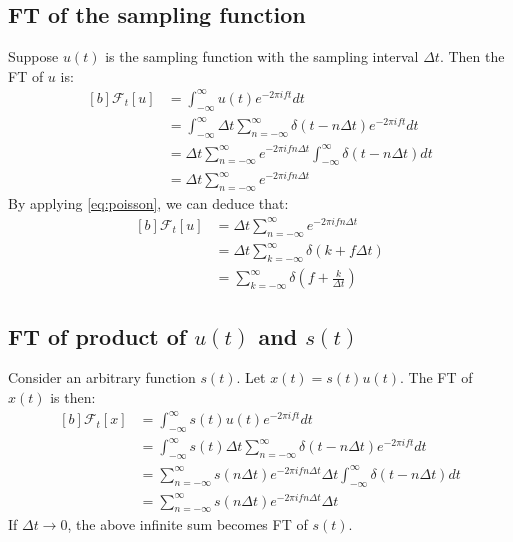 \documentclass[letterpaper, 11pt]{article}
\newcommand{\fint}{\int_{-\infty}^{\infty}} %
\newcommand{\fsum}[1]{\sum_{#1 = -\infty}^{\infty}} %
\newcommand{\spf}[2]{\Delta #1 \fsum{#2} \delta (#1 - #2 \Delta #1)} %
\newcommand{\fourier}[2]{\mathcal{F}_{#1}[#2]} %
\newcommand{\ft}[3]{\fint #2 e^{-2\pi i#3#1} d#1} %
\numberwithin{equation}{section}
\numberwithin{figure}{section}
\numberwithin{table}{section}
\begin{document}
\subsection{FT of the sampling function}
Suppose \(u(t)\) is the sampling function with the sampling interval \(\Delta t\). Then the FT of \(u\) is:
\begin{equation}
	\begin{aligned}[b]
		\fourier{t}{u}
			&= \ft{t}{u(t)}{f} \\
			&= \ft{t}{\spf{t}{n}}{f} \\
			&= \Delta t \fsum{n} e^{-2\pi ifn\Delta t} \fint \delta (t - n \Delta t) dt \\
			&= \Delta t \fsum{n} e^{-2\pi ifn\Delta t}
	\end{aligned}
\end{equation}
By applying \eqref{eq:poisson}, we can deduce that:
\begin{equation}
	\begin{aligned}[b]
		\fourier{t}{u}
			&= \Delta t \fsum{n} e^{-2\pi ifn\Delta t} \\
			&= \Delta t \fsum{k} \delta (k + f \Delta t)\\
			&= \fsum{k} \delta (f + \frac{k}{\Delta t})
	\end{aligned}
\end{equation}

\subsection{FT of product of \(u(t)\) and \(s(t)\)}\label{sec:su}
Consider an arbitrary function \(s(t)\). Let \(x(t) = s(t)u(t)\). The FT of \(x(t)\) is then:
\begin{equation}
	\begin{aligned}[b]
		\fourier{t}{x}
			&= \ft{t}{s(t)u(t)}{f}\\
			&= \ft{t}{s(t) \spf{t}{n}}{f}\\
			&= \fsum{n} s(n \Delta t) e^{-2\pi ifn\Delta t} \Delta t 
			   \fint \delta (t - n\Delta t) dt\\
			&= \fsum{n} s(n \Delta t) e^{-2\pi ifn\Delta t} \Delta t 
			\label{eq:ftsu}
	\end{aligned}
\end{equation}
If \(\Delta t \to 0\), the above infinite sum becomes FT of \(s(t)\). 

\end{document}
